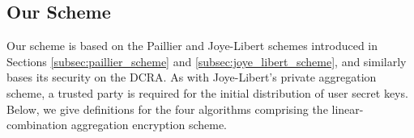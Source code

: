 \documentclass[10pt,letterpaper,oneside,twocolumn,journal]{IEEEtran}
\theoremstyle{definition}
\theoremstyle{definition}
\theoremstyle{remark}
\begin{document}
% 
% 

\subsection{Our Scheme} \label{subsec:our_scheme}
Our scheme is based on the Paillier and Joye-Libert schemes introduced in Sections \ref{subsec:paillier_scheme} and \ref{subsec:joye_libert_scheme}, and similarly bases its security on the DCRA. As with Joye-Libert's private aggregation scheme, a trusted party is required for the initial distribution of user secret keys. Below, we give definitions for the four algorithms comprising the linear-combination aggregation encryption scheme.
\end{document}
